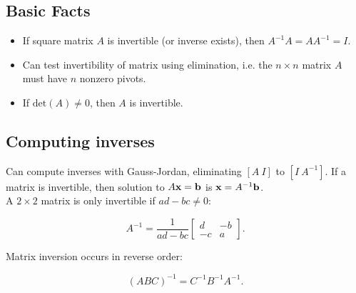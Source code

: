 \subsection{Basic Facts}

\begin{itemize}
    \item If square matrix $A$ is invertible (or inverse exists), then $\boxed{A^{-1}A=AA^{-1}=I}$.
    \item Can test invertibility of matrix using elimination, i.e. the $n\times n$ matrix $A$ must have $n$ nonzero pivots.
    \item If $\mathrm{det}(A)\neq 0$, then $A$ is invertible.
\end{itemize}

\subsection{Computing inverses}

Can compute inverses with Gauss-Jordan, eliminating $[A\:I]$ to $[I\:A^{-1}]$. 
If a matrix is invertible, then solution to $A\textbf{x}=\textbf{b}$ is $\textbf{x}=A^{-1}\textbf{b}$.\\

A $2\times 2$ matrix is only invertible if $ad-bc\neq 0$:

\[\boxed{
    A^{-1}=
    \frac{1}{ad-bc}
    \begin{bmatrix}
        d&-b\\
        -c&a
    \end{bmatrix}
.}\]

Matrix inversion occurs in reverse order:

\[\boxed{(ABC)^{-1}=C^{-1}B^{-1}A^{-1}}.\]